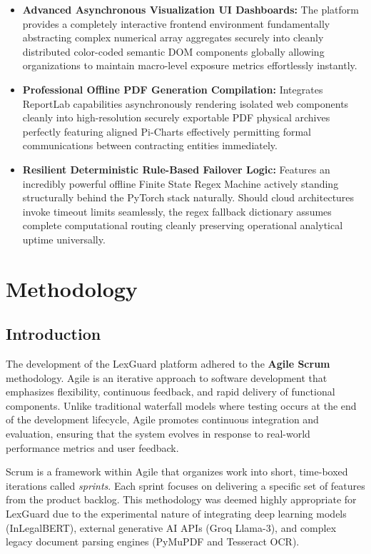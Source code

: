 \documentclass[a4paper,12pt]{report}
\begin{document}
\begin{itemize}
    \item \textbf{Advanced Asynchronous Visualization UI Dashboards:} The platform provides a completely interactive frontend environment fundamentally abstracting complex numerical array aggregates securely into cleanly distributed color-coded semantic DOM components globally allowing organizations to maintain macro-level exposure metrics effortlessly instantly.
    
    \item \textbf{Professional Offline PDF Generation Compilation:} Integrates ReportLab capabilities asynchronously rendering isolated web components cleanly into high-resolution securely exportable PDF physical archives perfectly featuring aligned Pi-Charts effectively permitting formal communications between contracting entities immediately.
    
    \item \textbf{Resilient Deterministic Rule-Based Failover Logic:} Features an incredibly powerful offline Finite State Regex Machine actively standing structurally behind the PyTorch stack naturally. Should cloud architectures invoke timeout limits seamlessly, the regex fallback dictionary assumes complete computational routing cleanly preserving operational analytical uptime universally.
\end{itemize}

\chapter{Methodology}

\section{Introduction}

The development of the LexGuard platform adhered to the \textbf{Agile Scrum} methodology. Agile is an iterative approach to software development that emphasizes flexibility, continuous feedback, and rapid delivery of functional components. Unlike traditional waterfall models where testing occurs at the end of the development lifecycle, Agile promotes continuous integration and evaluation, ensuring that the system evolves in response to real-world performance metrics and user feedback.

Scrum is a framework within Agile that organizes work into short, time-boxed iterations called \textit{sprints}. Each sprint focuses on delivering a specific set of features from the product backlog. This methodology was deemed highly appropriate for LexGuard due to the experimental nature of integrating deep learning models (InLegalBERT), external generative AI APIs (Groq Llama-3), and complex legacy document parsing engines (PyMuPDF and Tesseract OCR). 
\end{document}
